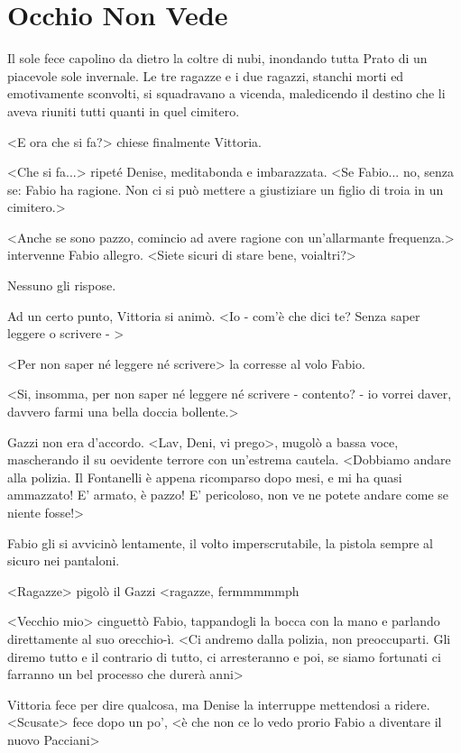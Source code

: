 \chapter{Occhio Non Vede}

Il sole fece capolino da dietro la coltre di nubi, inondando tutta Prato di un piacevole sole invernale. Le tre ragazze e i due ragazzi, stanchi morti ed emotivamente sconvolti, si squadravano a vicenda, maledicendo il destino che li aveva riuniti tutti quanti in quel cimitero.

<E ora che si fa?> chiese finalmente Vittoria.

<Che si fa...> ripeté Denise, meditabonda e imbarazzata. <Se Fabio... no, senza se: Fabio ha ragione. Non ci si può mettere a giustiziare un figlio di troia in un cimitero.>

<Anche se sono pazzo, comincio ad avere ragione con un'allarmante frequenza.> intervenne Fabio allegro. <Siete sicuri di stare bene, voialtri?>

Nessuno gli rispose.

Ad un certo punto, Vittoria si animò. <Io - com'è che dici te? Senza saper leggere o scrivere - >

<Per non saper né leggere né scrivere> la corresse al volo Fabio.

<Si, insomma, per non saper né leggere né scrivere - contento? - io vorrei daver, davvero farmi una bella doccia bollente.>

Gazzi non era d'accordo. <Lav, Deni, vi prego>, mugolò a bassa voce, mascherando il su oevidente terrore con un'estrema cautela. <Dobbiamo andare alla polizia. Il Fontanelli è appena ricomparso dopo mesi, e mi ha quasi ammazzato! E' armato, è pazzo! E' pericoloso, non ve ne potete andare come se niente fosse!>

Fabio gli si avvicinò lentamente, il volto imperscrutabile, la pistola sempre al sicuro nei pantaloni. 

<Ragazze> pigolò il Gazzi <ragazze, fermmmmmph

<Vecchio mio> cinguettò Fabio, tappandogli la bocca con la mano e parlando direttamente al suo orecchio-ì. <Ci andremo dalla polizia, non preoccuparti. Gli diremo tutto e il contrario di tutto, ci arresteranno e poi, se siamo fortunati ci farranno un bel processo che durerà anni>

Vittoria fece per dire qualcosa, ma Denise la interruppe mettendosi a ridere. <Scusate> fece dopo un po', <è che non ce lo vedo prorio Fabio a diventare il nuovo Pacciani>

